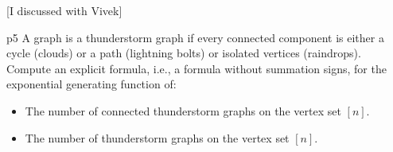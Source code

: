 \documentclass[a4paper, 11pt]{article}
\newcounter{problem}
\begin{document}
[I discussed with Vivek]\parinn



\begin{problem}{%
}{p5%
}
A graph is a thunderstorm graph if every connected component is either a cycle (clouds) or a path (lightning bolts) or isolated vertices (raindrops). Compute an explicit formula, i.e., a formula without summation signs, for the exponential generating function of:
\begin{itemize}[label=$\bullet$]
	\item The number of connected thunderstorm graphs on the vertex set $[n]$.
	\item The number of thunderstorm graphs on the vertex set $[n]$.
\end{itemize}
\end{problem}
\end{document}

